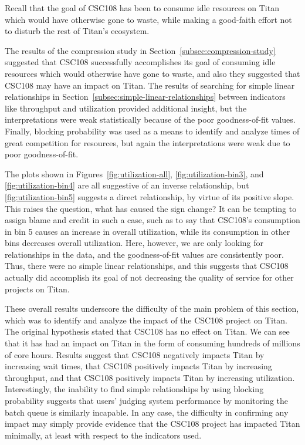 


Recall that the goal of CSC108 has been to consume idle resources on Titan
which would have otherwise gone to waste, while making a good-faith effort not
to disturb the rest of Titan's ecosystem.

The results of the compression study in Section~\ref{subsec:compression-study}
suggested that CSC108 successfully accomplishes its goal of consuming idle
resources which would otherwise have gone to waste, and also they suggested
that CSC108 may have an impact on Titan. The results of searching for simple
linear relationships in Section~\ref{subsec:simple-linear-relationships}
between indicators like throughput and utilization provided additional insight,
but the interpretations were weak statistically because of the poor
goodness-of-fit values. Finally, blocking probability was used as a means to
identify and analyze times of great competition for resources, but again the
interpretations were weak due to poor goodness-of-fit.


The plots shown in Figures~\ref{fig:utilization-all},
\ref{fig:utilization-bin3}, and \ref{fig:utilization-bin4} are all suggestive
of an inverse relationship, but \ref{fig:utilization-bin5} suggests a direct
relationship, by virtue of its positive slope. This raises the question, what
has caused the sign change? It can be tempting to assign blame and credit in
such a case, such as to say that CSC108's consumption in bin 5 causes an
increase in overall utilization, while its consumption in other bins decreases
overall utilization. Here, however, we are only looking for relationships in
the data, and the goodness-of-fit values are consistently poor. Thus, there
were no simple linear relationships, and this suggests that CSC108 actually did
accomplish its goal of not decreasing the quality of service for other projects
on Titan.

These overall results underscore the difficulty of the main problem of this
section, which was to identify and analyze the impact of the CSC108 project on
Titan. The original hypothesis stated that CSC108 has no effect on Titan. We
can see that it has had an impact on Titan in the form of consuming hundreds of
millions of core hours. Results suggest that CSC108 negatively impacts Titan by
increasing wait times, that CSC108 positively impacts Titan by increasing
throughput, and that CSC108 positively impacts Titan by increasing utilization.
Interestingly, the inability to find simple relationships by using blocking
probability suggests that users' judging system performance by monitoring the
batch queue is similarly incapable. In any case, the difficulty in confirming
any impact may simply provide evidence that the CSC108 project has impacted
Titan minimally, at least with respect to the indicators used.

